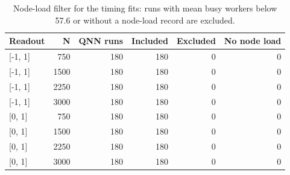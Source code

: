 \begin{table}[htbp]
\centering
\small
\caption{Node-load filter for the timing fits: runs with mean busy workers below 57.6 or without a node-load record are excluded.}
\label{tab:t5d}
\begin{tabular}{lrrrrr}
\toprule
Readout & N & QNN runs & Included & Excluded & No node load \\
\midrule
{[-1, 1]} & 750 & 180 & 180 & 0 & 0 \\
{[-1, 1]} & 1500 & 180 & 180 & 0 & 0 \\
{[-1, 1]} & 2250 & 180 & 180 & 0 & 0 \\
{[-1, 1]} & 3000 & 180 & 180 & 0 & 0 \\
\midrule
{[0, 1]} & 750 & 180 & 180 & 0 & 0 \\
{[0, 1]} & 1500 & 180 & 180 & 0 & 0 \\
{[0, 1]} & 2250 & 180 & 180 & 0 & 0 \\
{[0, 1]} & 3000 & 180 & 180 & 0 & 0 \\
\bottomrule
\end{tabular}
\end{table}
